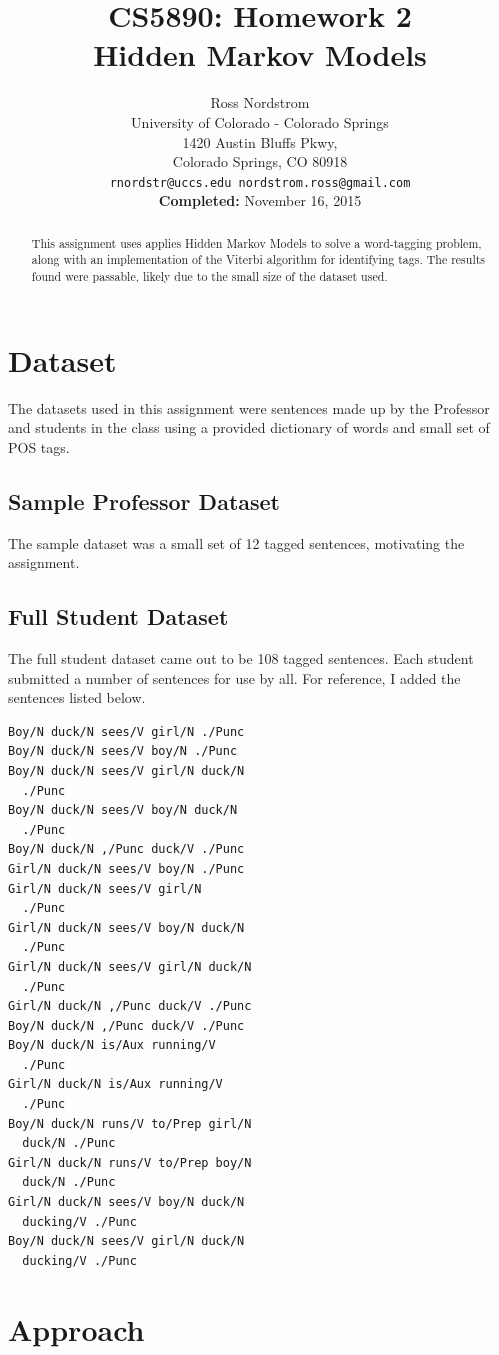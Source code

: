 \documentclass[11pt]{article}
\title{CS5890: Homework 2 \\ Hidden Markov Models}
\author{Ross Nordstrom \\
  University of Colorado - Colorado Springs \\
  1420 Austin Bluffs Pkwy, \\
  Colorado Springs, CO 80918 \\
  {\tt rnordstr@uccs.edu nordstrom.ross@gmail.com} \\
  \textbf{Completed:} November 16, 2015 \\}
\begin{document}
\maketitle
\begin{abstract}
This assignment uses applies Hidden Markov Models to solve a word-tagging problem, along with an implementation
of the Viterbi algorithm for identifying tags. The results found were passable, likely due to the small size of the
dataset used.
\end{abstract}

\section{Dataset}
The datasets used in this assignment were sentences made up by the Professor and students in the class using a
provided dictionary of words and small set of POS tags.

\subsection{Sample Professor Dataset}
The sample dataset was a small set of 12 tagged sentences, motivating the assignment.

\subsection{Full Student Dataset}
The full student dataset came out to be 108 tagged sentences. Each student submitted a number of sentences for use by
all. For reference, I added the sentences listed below.

\begin{lstlisting}
Boy/N duck/N sees/V girl/N ./Punc
Boy/N duck/N sees/V boy/N ./Punc
Boy/N duck/N sees/V girl/N duck/N
  ./Punc
Boy/N duck/N sees/V boy/N duck/N
  ./Punc
Boy/N duck/N ,/Punc duck/V ./Punc
Girl/N duck/N sees/V boy/N ./Punc
Girl/N duck/N sees/V girl/N
  ./Punc
Girl/N duck/N sees/V boy/N duck/N
  ./Punc
Girl/N duck/N sees/V girl/N duck/N
  ./Punc
Girl/N duck/N ,/Punc duck/V ./Punc
Boy/N duck/N ,/Punc duck/V ./Punc
Boy/N duck/N is/Aux running/V
  ./Punc
Girl/N duck/N is/Aux running/V
  ./Punc
Boy/N duck/N runs/V to/Prep girl/N
  duck/N ./Punc
Girl/N duck/N runs/V to/Prep boy/N
  duck/N ./Punc
Girl/N duck/N sees/V boy/N duck/N
  ducking/V ./Punc
Boy/N duck/N sees/V girl/N duck/N
  ducking/V ./Punc
\end{lstlisting}

\section{Approach}
\end{document}
